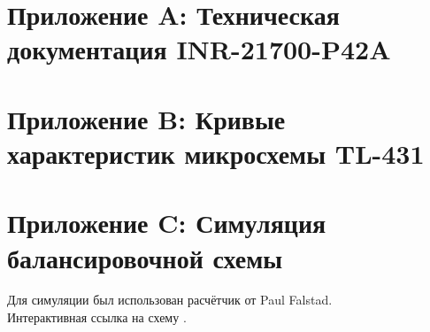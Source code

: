 \appendix

\section{Приложение A: Техническая документация INR-21700-P42A}\label{app:INR21700}

\section{Приложение B: Кривые характеристик микросхемы TL-431}\label{app:TL431_CURVES}


\section{Приложение C: Симуляция балансировочной схемы}\label{app:falstad}
Для симуляции был использован расчётчик от Paul Falstad. \\
Интерактивная ссылка на схему \href{\chemegeneral}{\color{blue}{тут}}.

